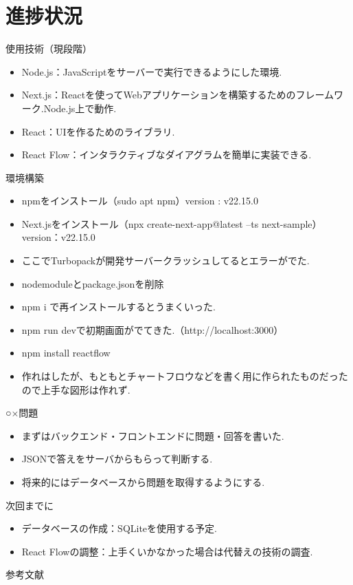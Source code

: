 \documentclass[aspectratio=169]{beamer}
\begin{document}
\section{進捗状況}
\begin{frame}{使用技術（現段階）}
    \begin{itemize}
        \item Node.js：JavaScriptをサーバーで実行できるようにした環境.
        \item Next.js：Reactを使ってWebアプリケーションを構築するためのフレームワーク.Node.js上で動作.
        \item React：UIを作るためのライブラリ.
        \item React Flow：インタラクティブなダイアグラムを簡単に実装できる.
    \end{itemize}
    
\end{frame}
\begin{frame}{環境構築}
    \begin{itemize}
        \setlength{\itemsep}{1em}
        \item npmをインストール（sudo apt npm）version : v22.15.0
        \item Next.jsをインストール（npx create-next-app@latest --ts next-sample）version：v22.15.0
        \item ここでTurbopackが開発サーバークラッシュしてるとエラーがでた.
        \item \rightarrow nodemoduleとpackage.jsonを削除
        \item npm i で再インストールするとうまくいった.
        \item npm run devで初期画面がでてきた.（http://localhost:3000）
        \item npm install reactflow
        \item 作れはしたが、もともとチャートフロウなどを書く用に作られたものだったので上手な図形は作れず.
    \end{itemize}    
\end{frame}

\begin{frame}{○×問題}
    \begin{itemize}
        \setlength{\itemsep}{1em}
        \item まずはバックエンド・フロントエンドに問題・回答を書いた.
        \item JSONで答えをサーバからもらって判断する.
        \item 将来的にはデータベースから問題を取得するようにする.
    \end{itemize}
\end{frame}

\begin{frame}{次回までに}
    \begin{itemize}
        \setlength{\itemsep}{1em}
        \item データベースの作成：SQLiteを使用する予定.
        \item React Flowの調整：上手くいかなかった場合は代替えの技術の調査.
    \end{itemize}
\end{frame}

\begin{frame}[allowframebreaks]{参考文献}
    \small
        
\end{frame}
\end{document}
